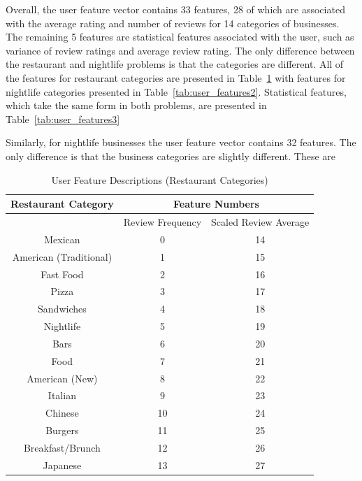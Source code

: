 \documentclass[11pt]{article}
\begin{document}
Overall, the user feature vector contains 33 features, 28 of which are associated with the average rating and number of reviews for 14 categories of businesses. The remaining 5 features are statistical features associated with the user, such as variance of review ratings and average review rating. The only difference between the restaurant and nightlife problems is that the categories are different. All of the features for restaurant categories are presented in Table~\ref{tab:user_features1} with features for nightlife categories presented in Table~\ref{tab:user_features2}. Statistical features, which take the same form in both problems, are presented in Table~\ref{tab:user_features3}

Similarly, for nightlife businesses the user feature vector contains 32 features. The only difference is that the business categories are slightly different. These are 

\begin{table}[h!]
	\caption{User Feature Descriptions (Restaurant Categories)}
	\centering
	\begin{tabular}{c|c|c}
		Restaurant Category & \multicolumn{2}{c}{Feature Numbers} \\ \hline
		& Review Frequency & Scaled Review Average \\
		Mexican & 0 & 14 \\
		American (Traditional) & 1 & 15\\
		Fast Food & 2 & 16\\
		Pizza & 3 & 17\\
		Sandwiches & 4 & 18\\
		Nightlife & 5 & 19\\
		Bars & 6 & 20\\
		Food & 7 & 21\\
		American (New) & 8 & 22\\
		Italian & 9 & 23\\
		Chinese & 10 & 24\\
		Burgers & 11 & 25\\
		Breakfast/Brunch & 12 & 26\\
		Japanese & 13 & 27\\
	\end{tabular}
	\label{tab:user_features1}
\end{table}
\end{document}
